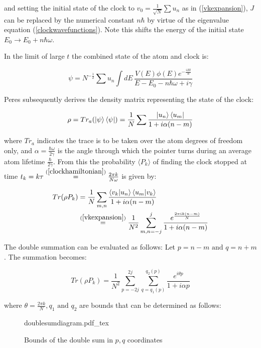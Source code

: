 \documentclass{article}
\newcommand{\incfig}[1]{%
    \def\svgwidth{10cm}
    {#1.pdf_tex}
}
\begin{document}
\noindent and setting the initial state of the clock to $v_0 = \frac{1}{\sqrt{N}}\sum u_n$ as in (\ref{vkexpansion}), $J$ can be replaced by the numerical constant $n\hbar$ by virtue of the eigenvalue equation (\ref{clockwavefunctions}). Note this shifts the energy of the initial state $E_0 \rightarrow E_0 + n\hbar\omega$.

\noindent In the limit of large $t$ the combined state of the atom and clock is:

\begin{equation}
	\psi = N^{-\frac{1}{2}}\sum u_n \int dE \, \frac{V(E)\phi(E)e^{-\frac{iEt}{\hbar}}}{E-E_0-n\hbar\omega+i\gamma}
\end{equation}

\noindent Peres subsequently derives the density matrix representing the state of the clock:

\begin{equation}
	\rho = Tr_a(\ket{\psi}\bra{\psi}) = \frac{1}{N}\sum \frac{\ket{u_n}\bra{u_m}}{1+i\alpha(n-m)}
\end{equation}

\noindent where $Tr_a$ indicates the trace is to be taken over the atom degrees of freedom only, and $\alpha = \frac{\hbar\omega}{2\gamma}$ is the angle through which the pointer turns during an average atom lifetime $\frac{\hbar}{2\gamma}$. From this the probability $\langle P_k \rangle$ of finding the clock stopped at time $t_k = k\tau \stackrel{(\ref{clockhamiltonian})}{=} \frac{2\pi k}{N\omega}$ is given by:

\begin{align}
	Tr(\rho P_k) &= \frac{1}{N}\sum_{m,n} \frac{\braket{v_k|u_n}\braket{u_m|v_k}}{1+i\alpha(n-m)} \\
		     &\stackrel{(\ref{vkexpansion})}{=} \frac{1}{N^2}\sum_{m,n=-j}^j \frac{e^{\frac{2\pi ik(n-m)}{N}}}{1+i\alpha(n-m)}
\end{align}

\noindent The double summation can be evaluated as follows: Let $p=n-m \text{ and } q=n+m$. The summation becomes:

\begin{equation}
	Tr(\rho P_k) = \frac{1}{N^2}\sum_{p=-2j}^{2j}\sum_{q=q_1(p)}^{q_2(p)}\frac{e^{i\theta p}}{1+i\alpha p}
\end{equation}

\noindent where $\theta = \frac{2\pi k}{N}, q_1 \text{ and } q_2$ are bounds that can be determined as follows:

\begin{figure}[ht]
    \centering
    \incfig{doublesumdiagram}
    \caption{Bounds of the double sum in $p,q$ coordinates}
    \label{fig:doublesumdiagram}
\end{figure}
\end{document}

